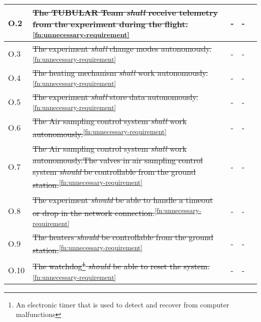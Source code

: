 \begin{longtable}[]{|m{}| m{} |m{} |m{}|m{}|}
O.2  & \st{The TUBULAR Team \textit{shall} receive telemetry from the experiment during the flight.}\textsuperscript{\ref{fn:unnecessary-requirement}}                                                                              &   -      & -            &        \\ \hline
O.3  & \st{The experiment \textit{shall} change modes autonomously.}\textsuperscript{\ref{fn:unnecessary-requirement}}                                                                                                              &        -      & -          &        \\ \hline
O.4  & \st{The heating mechanism \textit{shall} work autonomously.}\textsuperscript{\ref{fn:unnecessary-requirement}}                                                                                                               &        -      & -            &        \\ \hline
O.5  & \st{The experiment \textit{shall} store data autonomously.}\textsuperscript{\ref{fn:unnecessary-requirement}}                                                                                                                &       - & -            &        \\ \hline
O.6  & \st{The Air sampling control system \textit{shall} work autonomously.}\textsuperscript{\ref{fn:unnecessary-requirement}}                                                                                                     &       -     &  -          &        \\ \hline
O.7  & \st{The Air sampling control system \textit{shall} work autonomously.The valves in air sampling control system \textit{should} be controllable from the ground station.}\textsuperscript{\ref{fn:unnecessary-requirement}} &      -       &   -         &        \\ \hline
O.8  & \st{The experiment \textit{should} be able to handle a timeout or drop in the network connection.}\textsuperscript{\ref{fn:unnecessary-requirement}}                                                                         &    -         &  -  &        \\ \hline
O.9  & \st{The heaters \textit{should} be controllable from the ground station.}\textsuperscript{\ref{fn:unnecessary-requirement}}                                                                                                  &     -      &  -           &        \\ \hline
O.10 & \st{The watchdog\footnote{An electronic timer that is used to detect and recover from computer malfunctions} \textit{should} be able to reset the system.}\textsuperscript{\ref{fn:unnecessary-requirement}}               &    -        & -          &        \\ \hline

\end{longtable}
